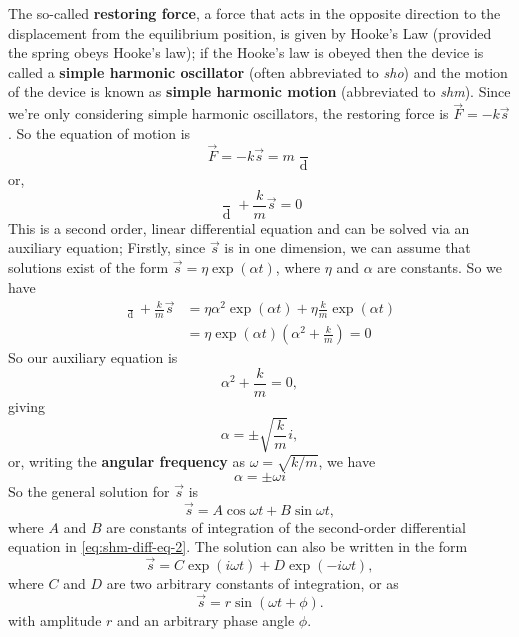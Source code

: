 The so-called \textbf{restoring force}, a force that acts in the opposite direction to the displacement from the equilibrium position, is given by Hooke's Law (provided the spring obeys Hooke's law); if the Hooke's law is obeyed then the device is called a \textbf{simple harmonic oscillator} (often abbreviated to \textit{sho}) and the motion of the device is known as \textbf{simple harmonic motion} (abbreviated to \textit{shm}). Since we're only considering simple harmonic oscillators, the restoring force is $\vec{F} = -k \vec{s}$. So the equation of motion is
\begin{equation}
    \label{eq:shm-diff-eq-1}
    \vec{F} = - k \vec{s} = m \frac{\mathop{\mathrm{d}^2 \vec{s}}}{\mathop{\mathrm{d}t^2}}
\end{equation}
or, 
\begin{equation}
    \label{eq:shm-diff-eq-2}
    \frac{\mathop{\mathrm{d}^2 \vec{s}}}{\mathop{\mathrm{d}t^2}} + \frac{k}{m} \vec{s} = 0
\end{equation}
This is a second order, linear differential equation and can be solved via an auxiliary equation; Firstly, since $\vec{s}$ is in one dimension, we can assume that solutions exist of the form $\vec{s} = \eta \exp(\alpha t)$, where $\eta$ and $\alpha$ are constants.  So we have
\begin{align*}
    \frac{\mathop{\mathrm{d}^2 \vec{s}}}{\mathop{\mathrm{d}t^2}} + \frac{k}{m} \vec{s} &= \eta \alpha^2 \exp (\alpha t) + \eta \frac{k}{m} \exp(\alpha t) \\
    &= \eta \exp (\alpha t) \left(\alpha^2 + \frac{k}{m}\right) = 0
\end{align*}
So our auxiliary equation is 
\begin{equation*}
    \alpha^2 + \frac{k}{m} = 0,
\end{equation*}
giving 
\begin{equation*}
    \alpha = \pm \sqrt{\frac{k}{m}} i,
\end{equation*}
or, writing the \textbf{angular frequency} as $\omega = \sqrt{k / m}$, we have
\begin{equation*}
    \alpha = \pm \omega i
\end{equation*}
So the general solution for $\vec{s}$ is
\begin{equation}
    \vec{s} = A \cos \omega t + B \sin \omega t,
\end{equation}
where $A$ and $B$ are constants of integration of the second-order differential equation in \ref{eq:shm-diff-eq-2}. The solution can also be written in the form
\begin{equation}
    \vec{s} = C \exp \left(i \omega t \right) + D \exp \left( -i \omega t \right),
\end{equation}
where $C$ and $D$ are two arbitrary constants of integration, or as 
\begin{equation}
    \vec{s} = r \sin \left( \omega t + \phi \right).
\end{equation}
with amplitude $r$ and an arbitrary phase angle $\phi$. 


